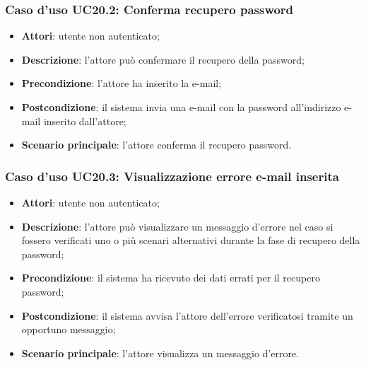 \subsubsection{Caso d'uso UC20.2: Conferma recupero password}
\begin{itemize}
	\item \textbf{Attori}: utente non autenticato;
	\item \textbf{Descrizione}: l'attore può confermare il recupero della password;
	\item \textbf{Precondizione}: l'attore ha inserito la e-mail;
	\item \textbf{Postcondizione}: il sistema invia una e-mail con la password all'indirizzo e-mail inserito dall'attore;
	\item \textbf{Scenario principale}: l'attore conferma il recupero password.
\end{itemize}

\subsubsection{Caso d'uso UC20.3: Visualizzazione errore e-mail inserita}
\begin{itemize}
	\item \textbf{Attori}: utente non autenticato;
	\item \textbf{Descrizione}: l'attore può visualizzare un messaggio d'errore nel caso si fossero verificati uno o più scenari alternativi durante la fase di recupero della password;
	\item \textbf{Precondizione}: il sistema ha ricevuto dei dati errati per il recupero password;
	\item \textbf{Postcondizione}: il sistema avvisa l'attore dell'errore verificatosi tramite un opportuno messaggio;
	\item \textbf{Scenario principale}: l'attore visualizza un messaggio d'errore.
\end{itemize}